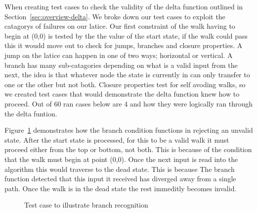 When creating test cases to check the validity of the delta function outlined in Section~\ref{sec:overview-delta}. We broke down our test cases to exploit the catagorys of failures on our latice.  Our first constraint of the walk having to begin at (0,0) is tested by the the value of the start state, if the walk could pass this it woudd move out to check for jumps, branches and closure properties. A jump on the latice can happen in one of two ways; horizontal or vertical. A branch has many sub-catagories depending on what is a valid input from the next, the idea is that whatever node the state is currently in can only transfer to one or the other but not both. Closure properties test for self avoding walks, so we created test cases that would demonstrate the delta function knew how to proceed. Out of 60 ran cases below are 4 and how they were logically ran through the delta funtion. 


Figure~\ref{fig:test-branch} demonstrates how the branch condition functions in rejecting an unvalid state. After the start state is processed, for this to be a valid walk it must proceed either from the top or bottom, not both. This is because of the condition that the walk must begin at point (0,0). Once the next input is read into the algorithm this would traverse to the dead state. This is because The branch function detected that this input it received has diverged away from a single path. Once the walk is in the dead state the rest immeditly becomes invalid.
\begin{figure}
\begin{center}
\end{center}
\caption{Test case to illustrate branch recognition}
\label{fig:test-branch}
\end{figure}


